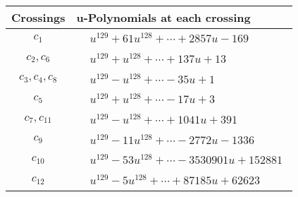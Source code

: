 \documentclass[1p]{elsarticle_modified}
\theoremstyle{definition}
\begin{document}
\begin{tabular}{m{50pt}|m{274pt}}
Crossings & \hspace{64pt}u-Polynomials at each crossing \\
\hline $$\begin{aligned}c_{1}\end{aligned}$$&$\begin{aligned}
&u^{129}+61 u^{128}+\cdots+2857 u-169
\end{aligned}$\\
\hline $$\begin{aligned}c_{2},c_{6}\end{aligned}$$&$\begin{aligned}
&u^{129}+u^{128}+\cdots+137 u+13
\end{aligned}$\\
\hline $$\begin{aligned}c_{3},c_{4},c_{8}\end{aligned}$$&$\begin{aligned}
&u^{129}- u^{128}+\cdots-35 u+1
\end{aligned}$\\
\hline $$\begin{aligned}c_{5}\end{aligned}$$&$\begin{aligned}
&u^{129}+u^{128}+\cdots-17 u+3
\end{aligned}$\\
\hline $$\begin{aligned}c_{7},c_{11}\end{aligned}$$&$\begin{aligned}
&u^{129}- u^{128}+\cdots+1041 u+391
\end{aligned}$\\
\hline $$\begin{aligned}c_{9}\end{aligned}$$&$\begin{aligned}
&u^{129}-11 u^{128}+\cdots-2772 u-1336
\end{aligned}$\\
\hline $$\begin{aligned}c_{10}\end{aligned}$$&$\begin{aligned}
&u^{129}-53 u^{128}+\cdots-3530901 u+152881
\end{aligned}$\\
\hline $$\begin{aligned}c_{12}\end{aligned}$$&$\begin{aligned}
&u^{129}-5 u^{128}+\cdots+87185 u+62623
\end{aligned}$\\
\hline
\end{tabular}\\~\\
\end{document}
